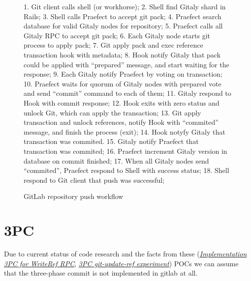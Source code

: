 \documentclass[acmlarge, screen, nonacm]{acmart}
\begin{document}
\begin{figure}
\begin{center}
  \end{center}
  \caption[GitLab repository push workflow]{
    GitLab repository push workflow} {
    \begin{flushleft}
    1. Git client calls shell (or workhorse);
    2. Shell find Gitaly shard in Rails;
    3. Shell calls Praefect to accept git pack; 
    4. Praefect search database for valid Gitaly nodes for repository;
    5. Praefect calls all Gitaly RPC to accept git pack;
    6. Each Gitaly node starts git process to apply pack; 
    7. Git apply pack and exec reference transaction hook with metadata;
    8. Hook notify Gitaly that pack could be applied with ``prepared'' message,
    and start waiting for the response;
    9. Each Gitaly notify Praefect by voting on transaction;
    10. Praefect waits for quorum of Gitaly nodes with prepared vote and
    send ``commit'' command to each of them;
    11. Gitaly respond to Hook with commit response;
    12. Hook exits with zero status and unlock Git, which can apply the transaction;
    13. Git apply transaction and unlock references, notify Hook with ``commited'' message,
    and finish the process (exit);
    14. Hook notyfy Gitaly that transaction was commited.
    15. Gitaly notify Praefect that transaction was commited;
    16. Praefect increment Gitaly version in database on commit finished;
    17. When all Gitaly nodes send ``commited'', Praefect respond to Shell with success status;
    18. Shell respond to Git client that push was successful;
    \end{flushleft}
  }\label{fig:push-workflow}
\end{figure}
\section{3PC}


Due to current status of code research and the facts from these 
(\emph{\href{https://gitlab.com/gitlab-org/gitaly/-/issues/2466}{Implementation 3PC for WriteRef RPC}},
\emph{\href{https://gitlab.com/gitlab-org/gitaly/-/issues/2529}{3PC git-update-ref experiment}})
POCs we can assume that the three-phase commit is not implemented in gitlab at all.
\end{document}
